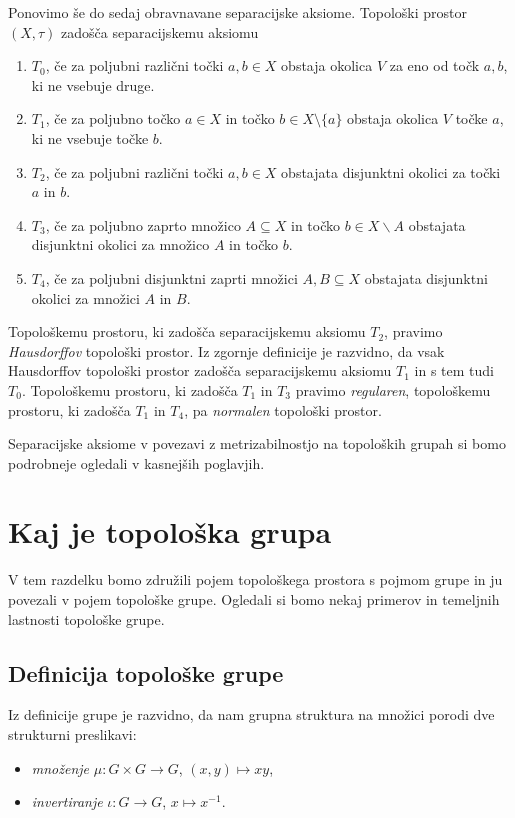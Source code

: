 \documentclass[mat1]{fmfdelo}
\begin{document}
Ponovimo še do sedaj obravnavane separacijske aksiome.
Topološki prostor $(X, \tau)$ zadošča separacijskemu aksiomu
\begin{enumerate}
\item[] $T_0$, če za poljubni različni točki $a, b \in X$ obstaja okolica $V$ za eno od točk $a, b$, ki ne vsebuje druge.
\item[] $T_1$, če za poljubno točko $a \in X$ in točko $b \in X\setminus\lbrace a \rbrace$ obstaja okolica $V$ točke $a$, ki ne vsebuje točke $b$.
\item[] $T_2$, če za poljubni različni točki $a, b \in X$ obstajata disjunktni okolici za točki $a$ in $b$.
\item[] $T_3$, če za poljubno zaprto množico $A \subseteq X$ in točko $b \in X\backslash A$ obstajata disjunktni okolici za množico $A$ in točko $b$.
\item[] $T_4$, če za poljubni disjunktni zaprti množici $A, B \subseteq X$ obstajata disjunktni okolici za množici $A$ in $B$.
\end{enumerate}

Topološkemu prostoru, ki zadošča separacijskemu aksiomu $T_2$, pravimo \emph{Hausdorffov} topološki prostor. Iz zgornje definicije je razvidno, da vsak Hausdorffov topološki prostor zadošča separacijskemu aksiomu $T_1$ in s tem tudi $T_0$.
Topološkemu prostoru, ki zadošča $T_1$ in $T_3$ pravimo \emph{regularen},
topološkemu prostoru, ki zadošča $T_1$ in $T_4$, pa \emph{normalen} topološki prostor.

Separacijske aksiome v povezavi z metrizabilnostjo na topoloških grupah si bomo podrobneje ogledali v kasnejših poglavjih.

\section{Kaj je topološka grupa}
V tem razdelku bomo združili pojem topološkega prostora s pojmom grupe in ju povezali v pojem topološke grupe. Ogledali si bomo nekaj primerov in temeljnih lastnosti topološke grupe.

\subsection{Definicija topološke grupe}
Iz definicije grupe je razvidno, da nam grupna struktura na množici porodi dve strukturni preslikavi:
\begin{itemize}
\item \emph{množenje} $\mu\colon G \times G \to G$, $(x, y) \mapsto xy$,
\item \emph{invertiranje} $\iota\colon G \to G$, $x \mapsto x^{-1}$.
\end{itemize}
\end{document}

